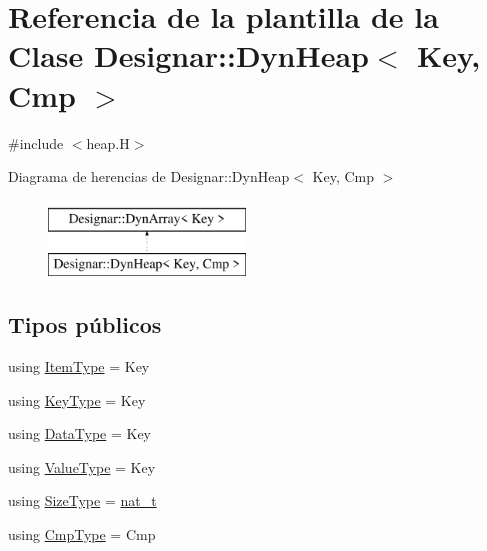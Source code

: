 \hypertarget{class_designar_1_1_dyn_heap}{}\section{Referencia de la plantilla de la Clase Designar\+:\+:Dyn\+Heap$<$ Key, Cmp $>$}
\label{class_designar_1_1_dyn_heap}


{\ttfamily \#include $<$heap.\+H$>$}

Diagrama de herencias de Designar\+:\+:Dyn\+Heap$<$ Key, Cmp $>$\begin{figure}[H]
\begin{center}
\leavevmode
\includegraphics[height=2.000000cm]{class_designar_1_1_dyn_heap}
\end{center}
\end{figure}
\subsection*{Tipos públicos}
\begin{DoxyCompactItemize}
\item 
using \hyperlink{class_designar_1_1_dyn_heap_a8b4add310e82b260912210069852febc}{Item\+Type} = Key
\item 
using \hyperlink{class_designar_1_1_dyn_heap_aa7260c4d35ad97e41f779bcf2b41808b}{Key\+Type} = Key
\item 
using \hyperlink{class_designar_1_1_dyn_heap_aa4011e735cd33c5043f59ae43a2ce318}{Data\+Type} = Key
\item 
using \hyperlink{class_designar_1_1_dyn_heap_a4c44d536a7ae76bbb7e667e1ea3b94ff}{Value\+Type} = Key
\item 
using \hyperlink{class_designar_1_1_dyn_heap_aa5d0813645a3a87407d2c95f0f4d5cad}{Size\+Type} = \hyperlink{namespace_designar_aa72662848b9f4815e7bf31a7cf3e33d1}{nat\+\_\+t}
\item 
using \hyperlink{class_designar_1_1_dyn_heap_af4eef9bc99b80f175c541cabff5333e0}{Cmp\+Type} = Cmp
\end{DoxyCompactItemize}
